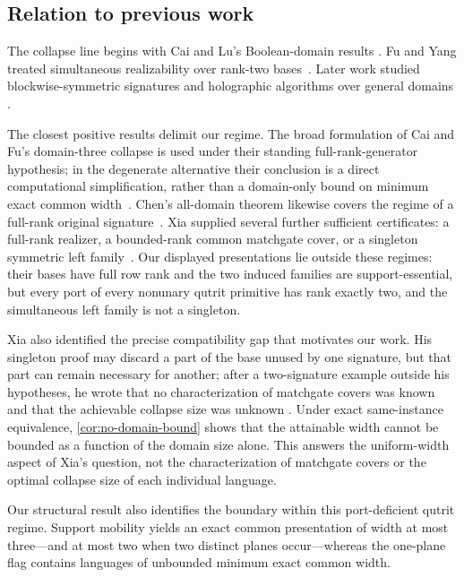 \documentclass[11pt]{article}
\theoremstyle{definition}
\theoremstyle{remark}
\begin{document}
\subsection{Relation to previous work}

The collapse line begins with Cai and Lu's Boolean-domain results
\cite{CaiLu2008,CaiLu2009}.  Fu and Yang treated simultaneous realizability
over rank-two bases~\cite{FuYang2014}.  Later work studied blockwise-symmetric
signatures and holographic algorithms over general domains
\cite{FuYangYin2019,FuCai2023}.

The closest positive results delimit our regime.  The broad formulation of
Cai and Fu's domain-three collapse is used under their standing
full-rank-generator hypothesis; in the degenerate alternative their
conclusion is a direct computational simplification, rather than a
domain-only bound on minimum exact common width~\cite{CaiFu2014}.  Chen's
all-domain theorem likewise covers the regime of a full-rank original
signature~\cite{Chen2016}.  Xia supplied several further sufficient
certificates: a full-rank realizer, a bounded-rank common matchgate cover, or
a singleton symmetric left family~\cite{Xia2016}.  Our displayed
presentations lie outside these regimes: their bases have full row rank and
the two induced families are support-essential, but every port of every
nonunary qutrit primitive has rank exactly two, and the simultaneous left
family is not a singleton.

Xia also identified the precise compatibility gap that motivates our work.
His singleton proof may discard a part of the base unused by one signature,
but that part can remain necessary for another; after a two-signature example
outside his hypotheses, he wrote that no characterization of matchgate
covers was known and that the achievable collapse size was unknown
\cite[end of Section~5]{Xia2016}.  Under exact same-instance equivalence,
\cref{cor:no-domain-bound} shows that the attainable width cannot be bounded
as a function of the domain size alone.  This answers the uniform-width
aspect of Xia's question, not the characterization of matchgate covers or the
optimal collapse size of each individual language.

Our structural result also identifies the boundary within this port-deficient
qutrit regime.  Support mobility yields an exact common presentation of width
at most three---and at most two when two distinct planes occur---whereas the
one-plane flag contains languages of unbounded minimum exact common width.
\end{document}
